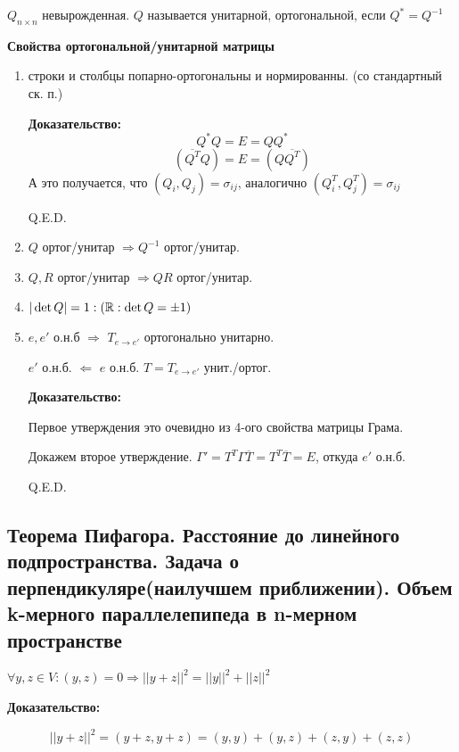  $Q_{n\times n}$ невырожденная. $Q$ называется унитарной, ортогональной, если $Q^* = Q^{-1}$

\textbf{Свойства ортогональной/унитарной матрицы}

\begin{enumerate}
    \item строки и столбцы попарно-ортогональны и нормированны. (со стандартный ск. п.)

\textbf{Доказательство:}
    $$Q^* Q = E = Q Q^*$$
    $$(\overline{Q^T} Q ) =E = (Q \overline{Q^T})$$
    А это получается, что $(Q_i,Q_j) = \sigma_{ij}$, аналогично $(Q_i^T,Q_j^T) = \sigma_{ij}$

    \hfill Q.E.D.

    \item $Q$ ортог/унитар $\Rightarrow Q^{-1}$ ортог/унитар.

    \item $Q,R$ ортог/унитар $\Rightarrow QR$ ортог/унитар.
    \item $|\det Q | = 1 :(\mathbb{R}: \det Q = \pm 1 )$
    \item $e,e'$ о.н.б $\Rightarrow$ $T_{e\rightarrow e'}$ ортогонально унитарно. 
    
    $e'$ о.н.б. $\Leftarrow$ $e$ о.н.б. $T = T_{e \rightarrow e'}$ унит./ортог.\textbf{}

    \textbf{Доказательство:}

    Первое утверждения это очевидно из 4-ого свойства матрицы Грама.

    Докажем второе утверждение. $\Gamma' = T^T \Gamma \overline{T} = T^T \overline{T} = E$, откуда $e'$ о.н.б.    

    \hfill Q.E.D.


\end{enumerate}

\pagebreak
\subsection{Теорема Пифагора. Расстояние до линейного подпространства. Задача о перпендикуляре(наилучшем приближении). Объем k-мерного параллелепипеда в n-мерном пространстве}


$\forall y,z \in V: (y,z) = 0 \Rightarrow ||y+z||^2 = ||y||^2 + ||z||^2$

\textbf{Доказательство:}

$$||y+z||^2 = (y+z,y+z) = (y,y) + (y,z) + (z,y) + (z,z)$$

